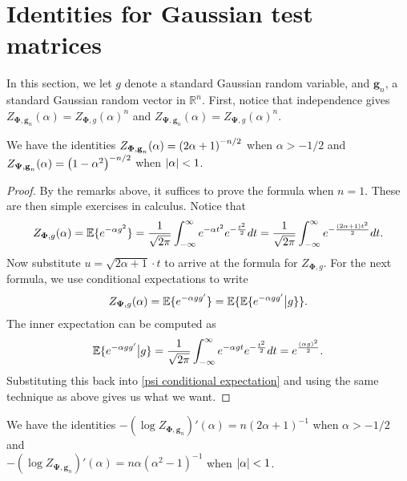 \documentclass[final,12pt]{colt2018} %
\numberwithin{equation}{section}
\DeclarePairedDelimiter{\abs}{\lvert}{\rvert}
\DeclarePairedDelimiter{\paren}{(}{)}
\DeclarePairedDelimiter{\braces}{\lbrace}{\rbrace}
\newcommand{\E}{\mathbb{E}}
\newcommand{\R}{\mathbb{R}}
\newcommand{\boldg}{\textbf{g}}
\newcommand{\boldPhi}{\boldsymbol{\Phi}}
\newcommand{\boldPsi}{\boldsymbol{\Psi}}
\begin{document}
\section{Identities for Gaussian test matrices}

In this section, we let $g$ denote a standard Gaussian random variable, and $\boldg_n$, a standard Gaussian random vector in $\R^n$. First, notice that independence gives $Z_{\boldPhi,\boldg_n}(\alpha) = Z_{\boldPhi,g}(\alpha)^n$ and $Z_{\boldPsi,\boldg_n}(\alpha) = Z_{\boldPsi,g}(\alpha)^n$.

\begin{lemma}
	We have the identities $Z_{\boldPhi,\boldg_n}(\alpha) = \paren*{2\alpha+1}^{-n/2}$ when $\alpha > -1/2$ and $Z_{\boldPsi,\boldg_n}(\alpha) = \paren*{1-\alpha^2}^{-n/2}$ when $\abs{\alpha} < 1$.
\end{lemma}

\begin{proof}
	By the remarks above, it suffices to prove the formula when $n=1$. These are then simple exercises in calculus. Notice that
	\[
	Z_{\boldPhi,g}(\alpha) = \E\braces{ e^{-\alpha g^2}} = \frac{1}{\sqrt{2\pi}}\int_{-\infty}^\infty e^{-\alpha t^2} e^{-\frac{t^2}{2}} dt = \frac{1}{\sqrt{2\pi}}\int_{-\infty}^\infty e^{-\frac{(2\alpha+1)t^2}{2}} dt.
	\]
	Now substitute $u = \sqrt{2\alpha+1}\cdot t$ to arrive at the formula for $Z_{\boldPhi,g}$. For the next formula, we use conditional expectations to write
	\begin{align} \label{psi conditional expectation}
	Z_{\boldPsi,g}(\alpha) = \E\braces{ e^{-\alpha g g'}} = \E\braces{ \E\braces{e^{-\alpha g g'} \big| g}}.
	\end{align}
	The inner expectation can be computed as
	\[
	\E\braces{e^{-\alpha g g'} \big| g} = \frac{1}{\sqrt{2\pi}}\int_{-\infty}^\infty e^{-\alpha g t} e^{-\frac{t^2}{2}} dt = e^{\frac{(\alpha g)^2}{2}}.
	\]
	Substituting this back into \eqref{psi conditional expectation} and using the same technique as above gives us what we want.
\end{proof}

\begin{lemma} \label{lem: formula for log derivatives for Gaussian}
	We have the identities $-(\log Z_{\boldPhi,\boldg_n})'(\alpha) = n(2\alpha+1)^{-1}$ when $\alpha > -1/2$ and \\ $-(\log Z_{\boldPsi,\boldg_n})'(\alpha) = n\alpha(\alpha^2-1)^{-1}$ when $\abs{\alpha} < 1$.
\end{lemma}
\end{document}
